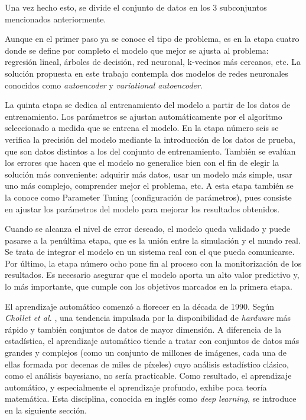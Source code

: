 Una vez hecho esto, se divide el conjunto de datos en los 3 subconjuntos mencionados anteriormente. 

Aunque en el primer paso ya se conoce el tipo de problema, es en la etapa cuatro donde se define por completo el modelo que mejor se ajusta al problema: regresión lineal, árboles de decisión, red neuronal, k-vecinos más cercanos, etc. La solución propuesta en este trabajo contempla dos modelos de redes neuronales conocidos como \textit{autoencoder} y \textit{variational autoencoder}.

La quinta etapa se dedica al entrenamiento del modelo a partir de los datos de entrenamiento. Los parámetros se ajustan automáticamente por el algoritmo seleccionado a medida que se entrena el modelo. En la etapa número seis se verifica la precisión del modelo mediante la introducción de los datos de prueba, que son datos distintos a los del conjunto de entrenamiento. También se evalúan los errores que hacen que el modelo no generalice bien con el fin de elegir la solución más conveniente: adquirir más datos, usar un modelo más simple, usar uno más complejo, comprender mejor el problema, etc. A esta etapa también se la conoce como Parameter Tuning (configuración de parámetros), pues consiste en ajustar los parámetros del modelo para mejorar los resultados obtenidos.

Cuando se alcanza el nivel de error deseado, el modelo queda validado y puede pasarse a la penúltima etapa, que es la unión entre la simulación y el mundo real. Se trata de integrar el modelo en un sistema real con el que pueda comunicarse. Por último, la etapa número ocho pone fin al proceso con la monitorización de los resultados. Es necesario asegurar que el modelo aporta un alto valor predictivo y, lo más importante, que
cumple con los objetivos marcados en la primera etapa.

El aprendizaje automático comenzó a florecer en la década de 1990. Según \textit{Chollet et al.} \cite{Chollet}, una tendencia impulsada por la disponibilidad de \textit{hardware} más rápido y también conjuntos de datos de mayor dimensión. A diferencia de la estadística, el aprendizaje automático tiende a tratar con conjuntos de datos más grandes y complejos (como un conjunto de millones de imágenes, cada una de ellas formada por decenas de miles de píxeles) cuyo análisis estadístico clásico, como el análisis bayesiano, no sería practicable. Como resultado, el aprendizaje automático, y especialmente el aprendizaje profundo, exhibe poca teoría matemática. Esta disciplina, conocida en inglés como \textit{deep learning}, se introduce en la siguiente sección.


